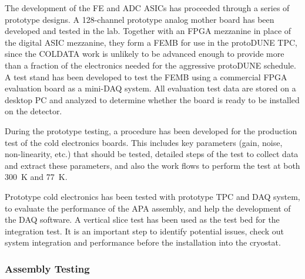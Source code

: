 
The development of the FE and ADC ASICs has proceeded through a series of prototype designs.
A 128-channel prototype analog mother board has been developed and tested in the lab.
Together with an FPGA mezzanine in place of the digital ASIC mezzanine,
they form a FEMB for use in the protoDUNE TPC,
since the COLDATA work is unlikely to be advanced enough to
provide more than a fraction of the electronics needed for the aggressive protoDUNE schedule.
A test stand has been developed to test the FEMB
using a commercial FPGA evaluation board as a mini-DAQ system.
All evaluation test data are stored on a desktop PC and analyzed to
determine whether the board is ready to be installed on the detector.

During the prototype testing, a procedure has been developed for the production test of the cold electronics boards.
This includes key parameters (gain, noise, non-linearity, etc.) that should be tested,
detailed steps of the test to collect data and extract these parameters,
and also the work flows to perform the test at both 300~K and 77~K.

Prototype cold electronics has been tested with prototype TPC and DAQ system,
to evaluate the performance of the APA assembly, and help the development of the DAQ software.
A vertical slice test has been used as the test bed for the integration test.
It is an important step to identify potential issues, check out system integration and performance
before the installation into the cryostat.

\subsubsection{Assembly Testing}
\label{subsubsec:ce_install_assembly}

